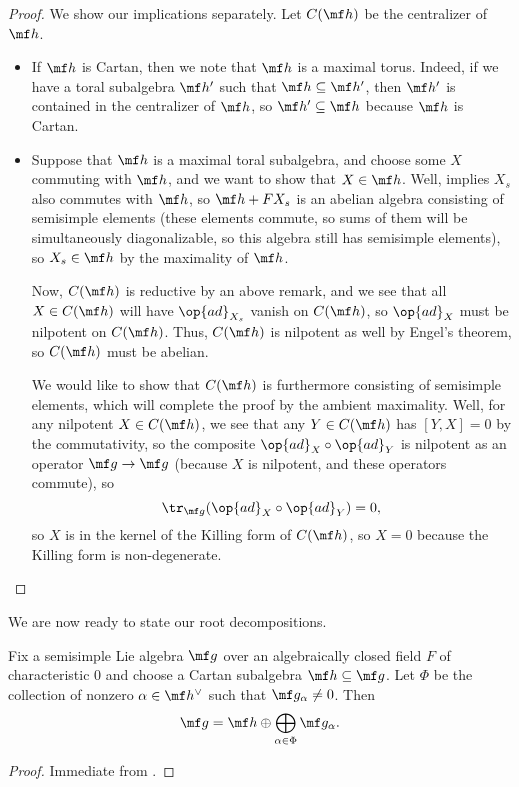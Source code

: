 \documentclass[../notes.tex]{subfiles}
\begin{document}
\begin{proof}
	We show our implications separately. Let $C(\mf h)$ be the centralizer of $\mf h$.
	\begin{itemize}
		\item If $\mf h$ is Cartan, then we note that $\mf h$ is a maximal torus. Indeed, if we have a toral subalgebra $\mf h'$ such that $\mf h\subseteq\mf h'$, then $\mf h'$ is contained in the centralizer of $\mf h$, so $\mf h'\subseteq\mf h$ because $\mf h$ is Cartan.

		\item Suppose that $\mf h$ is a maximal toral subalgebra, and choose some $X$ commuting with $\mf h$, and we want to show that $X\in\mf h$. Well,  implies $X_s$ also commutes with $\mf h$, so $\mf h+FX_s$ is an abelian algebra consisting of semisimple elements (these elements commute, so sums of them will be simultaneously diagonalizable, so this algebra still has semisimple elements), so $X_s\in\mf h$ by the maximality of $\mf h$.

		Now, $C(\mf h)$ is reductive by an above remark, and we see that all $X\in C(\mf h)$ will have $\op{ad}_{X_s}$ vanish on $C(\mf h)$, so $\op{ad}_X$ must be nilpotent on $C(\mf h)$. Thus, $C(\mf h)$ is nilpotent as well by Engel's theorem, so $C(\mf h)$ must be abelian.

		We would like to show that $C(\mf h)$ is furthermore consisting of semisimple elements, which will complete the proof by the ambient maximality. Well, for any nilpotent $X\in C(\mf h)$, we see that any $Y\in C(\mf h)$ has $[Y,X]=0$ by the commutativity, so the composite ${\op{ad}_X}\circ{\op{ad}_Y}$ is nilpotent as an operator $\mf g\to\mf g$ (because $X$ is nilpotent, and these operators commute), so
		\[\tr_{\mf g}({\op{ad}_X}\circ{\op{ad}_Y})=0,\]
		so $X$ is in the kernel of the Killing form of $C(\mf h)$, so $X=0$ because the Killing form is non-degenerate.
		\qedhere
	\end{itemize}
\end{proof}
We are now ready to state our root decompositions.
\begin{corollary}
	Fix a semisimple Lie algebra $\mf g$ over an algebraically closed field $F$ of characteristic $0$ and choose a Cartan subalgebra $\mf h\subseteq\mf g$. Let $\Phi$ be the collection of nonzero $\alpha\in\mf h^\lor$ such that $\mf g_\alpha\ne0$. Then
	\[\mf g=\mf h\oplus\bigoplus_{\alpha\in\Phi}\mf g_\alpha.\]
\end{corollary}
\begin{proof}
	Immediate from .
\end{proof}
\end{document}
